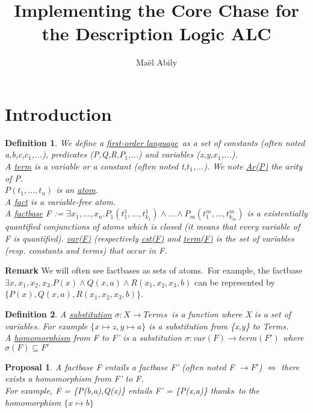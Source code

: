 \documentclass{article}
\title{Implementing the Core Chase for the Description Logic ALC}
\author{Maël Abily}	%
\newtheorem{pro}{Proposal}
\newtheorem{defi}{Definition}
\begin{document}
\maketitle						%




\section{Introduction}

\begin{defi} We define a \underline{first-order language}\ as a set of constants (often noted a,b,c,$c_{1}$,...), predicates (P,Q,R,$P_{1}$,...) and variables (x,y,$x_{1}$,...). \\
A \underline{term} is a variable or a constant (often noted t,$t_{1}$,...).
We note \underline{Ar(P)} the arity of P. \\
$P(t_{1},...,t_{n})$ is an \underline{atom}. \\
A \underline{fact} is a variable-free atom. \\
A \underline{factbase} F := $\exists x_{1},...,x_{n}.P_{1}(t_{1}^{1},...,t_{k_{1}}^{1})\land ...\land P_{m}(t_{1}^{m},...,t_{k_{m}}^{m})$ is a existentially quantified conjunctions of atoms which is closed (it means that every variable of F is quantified). \underline{var(F)} (respectively \underline{cst(F)} and \underline{term(F)} is the set of variables (resp. constants and terms) that occur in F.
\end{defi}
\noindent \textbf{Remark} We will often see factbases as sets of atoms.\ For example, the factbase $\exists x,x_{1},x_{2},x_{3}. P(x) \land Q(x,a) \land R(x_{1},x_{2},x_{3},b)$ can be represented by \\
$\{P(x),Q(x,a),R(x_{1},x_{2},x_{3},b)\}$.

\begin{defi}
A \underline{substitution} $\sigma:X \to Terms$\ is a function where X is a set of variables. For example $\{x \mapsto z, y \mapsto a \}$ is a substitution from \{x,y\} to Terms. \\
A \underline{homomorphism} from F to F' is a substitution $\sigma:var(F) \to term(F')$ where $\sigma(F) \subseteq F'$
\end{defi}
\begin{pro}
A factbase F entails a factbase F' (often noted F $\to F'$) $\Leftrightarrow$ there exists a homomorphism from F' to F. \\
For example, F = \{P(b,a),Q(x)\} entails F' = \{P(x,a)\} thanks\ to the homomorphism $\{x \mapsto b\}$ 
\end{pro}
\end{document}
